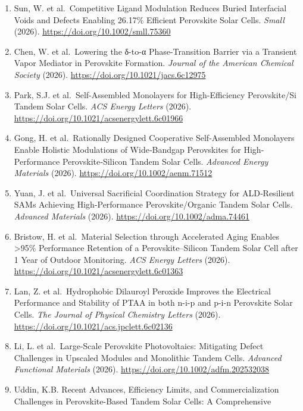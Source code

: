 \documentclass[
  11pt,
]{article}
\begin{document}
\begin{enumerate}
  Charge Transport and Defect Passivation in High-Performance Perovskite
  Solar Cells. \emph{Nano-Micro Letters} (2026).
  \url{https://doi.org/10.1007/s40820-026-02278-6}
\item
  Sun, W. et al.~Competitive Ligand Modulation Reduces Buried
  Interfacial Voids and Defects Enabling 26.17\% Efficient Perovskite
  Solar Cells. \emph{Small} (2026).
  \url{https://doi.org/10.1002/smll.75360}
\item
  Chen, W. et al.~Lowering the δ-to-α Phase-Transition Barrier via a
  Transient Vapor Mediator in Perovskite Formation. \emph{Journal of the
  American Chemical Society} (2026).
  \url{https://doi.org/10.1021/jacs.6c12975}
\item
  Park, S.J. et al.~Self-Assembled Monolayers for High-Efficiency
  Perovskite/Si Tandem Solar Cells. \emph{ACS Energy Letters} (2026).
  \url{https://doi.org/10.1021/acsenergylett.6c01966}
\item
  Gong, H. et al.~Rationally Designed Cooperative Self‐Assembled
  Monolayers Enable Holistic Modulations of Wide‐Bandgap Perovskites for
  High‐Performance Perovskite‐Silicon Tandem Solar Cells. \emph{Advanced
  Energy Materials} (2026). \url{https://doi.org/10.1002/aenm.71512}
\item
  Yuan, J. et al.~Universal Sacrificial Coordination Strategy for
  ALD‐Resilient SAMs Achieving High‐Performance Perovskite/Organic
  Tandem Solar Cells. \emph{Advanced Materials} (2026).
  \url{https://doi.org/10.1002/adma.74461}
\item
  Bristow, H. et al.~Material Selection through Accelerated Aging
  Enables \textgreater95\% Performance Retention of a
  Perovskite--Silicon Tandem Solar Cell after 1 Year of Outdoor
  Monitoring. \emph{ACS Energy Letters} (2026).
  \url{https://doi.org/10.1021/acsenergylett.6c01363}
\item
  Lan, Z. et al.~Hydrophobic Dilauroyl Peroxide Improves the Electrical
  Performance and Stability of PTAA in both n-i-p and p-i-n Perovskite
  Solar Cells. \emph{The Journal of Physical Chemistry Letters} (2026).
  \url{https://doi.org/10.1021/acs.jpclett.6c02136}
\item
  Li, L. et al.~Large‐Scale Perovskite Photovoltaics: Mitigating Defect
  Challenges in Upscaled Modules and Monolithic Tandem Cells.
  \emph{Advanced Functional Materials} (2026).
  \url{https://doi.org/10.1002/adfm.202532038}
\item
  Uddin, K.B. Recent Advances, Efficiency Limits, and Commercialization
  Challenges in Perovskite-Based Tandem Solar Cells: A Comprehensive

\end{enumerate}
\end{document}
